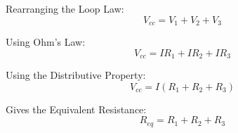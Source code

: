 \documentclass{beamer}
\begin{document}
\begin{frame}
\begin{columns}
\begin{column}{5cm}
Rearranging the Loop Law:
\begin{equation}
V_{cc} = V_1 + V_2 + V_3
\end{equation}

Using Ohm's Law:
\begin{equation}
V_{cc} = I R_1 + I R_2 + I R_3
\end{equation}

Using the Distributive Property:
\begin{equation}
V_{cc} = I (R_1 + R_2 + R_3)
\end{equation}

Gives the Equivalent Resistance:
\begin{equation}
\boxed{R_{eq} = R_1 + R_2 + R_3}
\end{equation}

\end{column}
\end{columns}
\end{frame}
\end{document}
